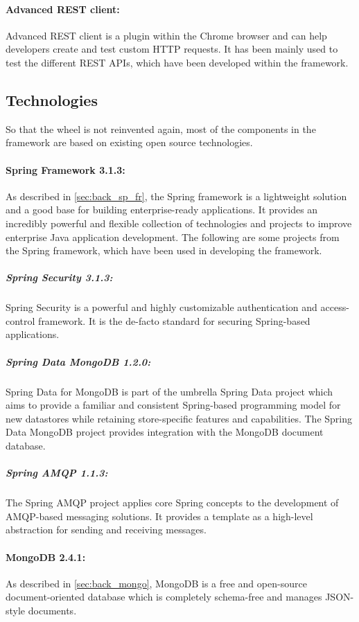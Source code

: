 \paragraph{Advanced REST client:\label{sec:impl_advanced_rest_cl}} Advanced \ac{REST} client is a plugin within the Chrome browser and can help developers create and test custom \ac{HTTP} requests. It has been mainly used to test the different \ac{REST} \ac{API}s, which have been developed within the framework.

\subsection{Technologies\label{sec:impl_technologies}}
So that the wheel is not reinvented again, most of the components in the framework are based on existing open source technologies. 

\paragraph{Spring Framework 3.1.3:\label{sec:impl_spring}} As described in \ref{sec:back_sp_fr}, the Spring framework is a lightweight solution and a good base for building enterprise-ready applications. It provides an incredibly powerful and flexible collection of technologies and projects to improve enterprise Java application development. The following are some projects from the Spring framework, which have been used in developing the framework.

\subparagraph{Spring Security 3.1.3:\label{sec:impl_spring_sec}} Spring Security is a powerful and highly customizable authentication and access-control framework. It is the de-facto standard for securing Spring-based applications.

\subparagraph{Spring Data MongoDB 1.2.0:\label{sec:impl_spring_data}} Spring Data for MongoDB is part of the umbrella Spring Data project which aims to provide a familiar and consistent Spring-based programming model for new datastores while retaining store-specific features and capabilities. The Spring Data MongoDB project provides integration with the MongoDB document database.

\subparagraph{Spring AMQP 1.1.3:\label{sec:impl_spring_amqp}} The Spring AMQP project applies core Spring concepts to the development of AMQP-based messaging solutions. It provides a template as a high-level abstraction for sending and receiving messages.

\paragraph{MongoDB 2.4.1:\label{sec:impl_mongo}} As described in \ref{sec:back_mongo}, MongoDB is a free and open-source document-oriented database which is completely schema-free and manages \ac{JSON}-style documents.

